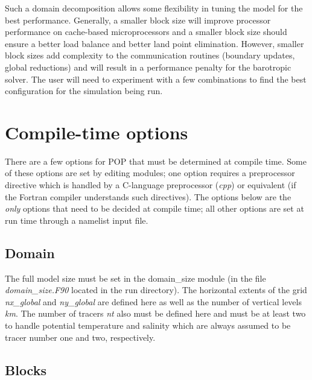 Such a domain decomposition allows some flexibility
in tuning the model for the best performance.  Generally,
a smaller block size will improve processor performance
on cache-based microprocessors and a smaller block
size should ensure a better load balance and better
land point elimination.  However,
smaller block sizes add complexity to the communication
routines (boundary updates, global reductions) and
will result in a performance penalty for the barotropic
solver.  The user will need to experiment
with a few combinations to find the best configuration
for the simulation being run.

\section{Compile-time options}\label{sec:compile-opts}

There are a few options for POP that must be determined at
compile time. Some of these options are set by editing
modules; one option requires a preprocessor
directive which is handled by a
C-language preprocessor ({\em cpp}) or equivalent (if the
Fortran compiler understands such directives).  The
options below are the {\em only} options that need to
be decided at compile time; all other options are set
at run time through a namelist input file.

\subsection{Domain}\label{sec:compile-domain}

The full model size must be set in the domain\_size module
(in the file {\em domain\_size.F90} located in the run directory).
The horizontal extents of the grid {\em nx\_global} and 
{\em ny\_global} are defined here as well as the number of 
vertical levels {\em km}.  The number of tracers
{\em nt} also must be defined here and must be at least two
to handle potential temperature and salinity which are always
assumed to be tracer number one and two, respectively.

\subsection{Blocks}\label{sec:compile-blocks}

